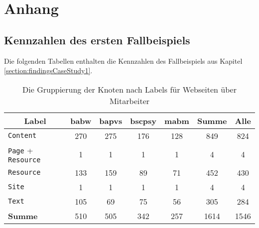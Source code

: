 \chapter{Anhang}
    \section{Kennzahlen des ersten Fallbeispiels}
        \label{section:appendixExample1Figures}
        Die folgenden Tabellen enthalten die Kennzahlen des
        Fallbeispiels aus Kapitel \ref{section:findingsCaseStudy1}.

        \begin{table}[!h]
            \centering
            \begin{tabular}{|l|c|c|c|c|c|c|}
                \hline
                \multicolumn{1}{|c|}{\textbf{Label}} & \textbf{\gls{babw}} & \textbf{\gls{bapvs}} & \textbf{\gls{bscpsy}} & \textbf{\gls{mabm}} & \textbf{Summe} & \textbf{Alle} \\ \hline
                \texttt{Content}                                     & 270           & 275            & 176             & 128           & 849            & 824           \\ \hline
                \texttt{Page} + \texttt{Resource}                             & 1             & 1              & 1               & 1             & 4              & 4             \\ \hline
                \texttt{Resource}                                    & 133           & 159            & 89              & 71            & 452            & 430           \\ \hline
                \texttt{Site}                                        & 1             & 1              & 1               & 1             & 4              & 4             \\ \hline
                \texttt{Text}                                        & 105           & 69             & 75              & 56            & 305            & 284           \\ \hline
                \hline
                \textbf{Summe}                              & 510           & 505            & 342             & 257           & 1614           & 1546          \\ \hline
            \end{tabular}
            \caption{Die Gruppierung der Knoten nach Labels für Webseiten über Mitarbeiter}
            \label{table:findingsTeachersFiguresNodesByLabel}
        \end{table}

